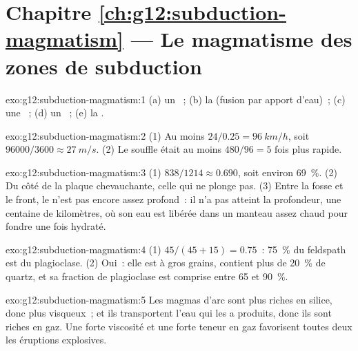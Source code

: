 \section*{Chapitre \ref{ch:g12:subduction-magmatism} --- Le magmatisme des zones de subduction}

\begin{solution}{exo:g12:subduction-magmatism:1}
(a) un ~; (b) la  (fusion par apport d'eau)~;
(c) une ~; (d) un ~; (e) la .
\end{solution}

\begin{solution}{exo:g12:subduction-magmatism:2}
(1) Au moins $24/0.25 = \qty{96}{km/h}$, soit $\num{96000}/3600 \approx
\qty{27}{m/s}$. (2) Le souffle était au moins $480/96 = 5$ fois plus
rapide.
\end{solution}

\begin{solution}{exo:g12:subduction-magmatism:3}
(1) $838/1214 \approx 0.690$, soit environ \qty{69}{\percent}. (2) Du côté
de la plaque chevauchante, celle qui ne plonge pas. (3) Entre la fosse et
le front, le  n'est pas encore assez profond~: il n'a pas
atteint la profondeur, une centaine de kilomètres, où son eau est libérée
dans un manteau assez chaud pour fondre une fois hydraté.
\end{solution}

\begin{solution}{exo:g12:subduction-magmatism:4}
(1) $45/(45 + 15) = 0.75$~: \qty{75}{\percent} du feldspath est du
plagioclase. (2) Oui~: elle est à gros grains, contient plus de
\qty{20}{\percent} de quartz, et sa fraction de plagioclase est comprise
entre 65 et \qty{90}{\percent}.
\end{solution}

\begin{solution}{exo:g12:subduction-magmatism:5}
Les magmas d'arc sont plus riches en silice, donc plus visqueux~; et ils
transportent l'eau qui les a produits, donc ils sont riches en gaz. Une
forte viscosité et une forte teneur en gaz favorisent toutes deux les
éruptions explosives.
\end{solution}

